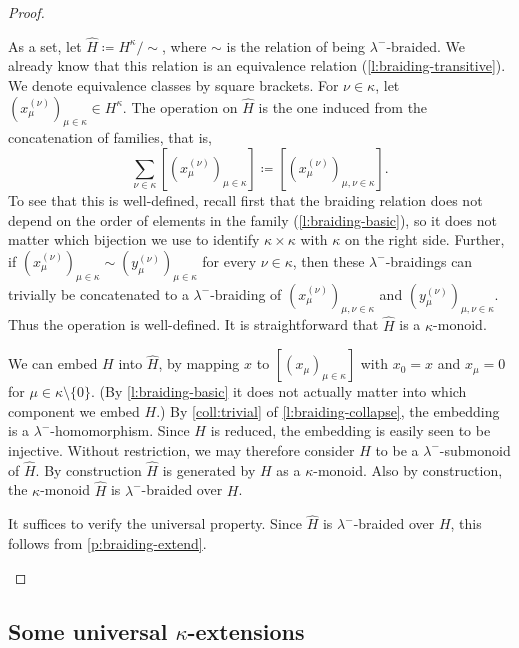 \documentclass[a4paper,11pt,oneside]{amsart}
\theoremstyle{remark}
\begin{document}
\begin{proof}
  \begin{proofenumerate}
  \item[\ref{ue:braided}]
  As a set, let $\widehat H \coloneqq H^\kappa /\! \sim$, where $\sim$ is the relation of being $\lambda^-$-braided.
  We already know that this relation is an equivalence relation (\cref{l:braiding-transitive}).
  We denote equivalence classes by square brackets.
  For $\nu \in \kappa$, let $(x_{\mu}^{(\nu)})_{\mu \in \kappa} \in H^\kappa$.
  The operation on $\widehat H$ is the one induced from the concatenation of families, that is,
  \[
    \sum_{\nu \in \kappa} [ (x_\mu^{(\nu)})_{\mu \in \kappa} ] \coloneqq [(x_{\mu}^{(\nu)})_{\mu, \nu \in \kappa}].
  \]
  To see that this is well-defined, recall first that the braiding relation does not depend on the order of elements in the family (\cref{l:braiding-basic}), so it does not matter which bijection we use to identify $\kappa \times \kappa$ with $\kappa$ on the right side.
  Further, if $(x_\mu^{(\nu)})_{\mu \in \kappa} \sim (y_\mu^{(\nu)})_{\mu \in \kappa}$ for every $\nu \in \kappa$, then these $\lambda^-$-braidings can trivially be concatenated to a $\lambda^-$-braiding of $(x_\mu^{(\nu)})_{\mu,\nu \in \kappa}$ and $(y_\mu^{(\nu)})_{\mu,\nu \in \kappa}$.
  Thus the operation is well-defined.
  It is straightforward that $\widehat H$ is a $\kappa$-monoid.

  We can embed $H$ into $\widehat H$, by mapping $x$ to $[(x_\mu)_{\mu \in \kappa}]$ with $x_0=x$ and $x_\mu = 0$ for $\mu \in \kappa \setminus \{0\}$.
  (By \cref{l:braiding-basic} it does not actually matter into which component we embed $H$.)
  By \ref{coll:trivial} of \cref{l:braiding-collapse}, the embedding is a $\lambda^-$-homomorphism.
  Since $H$ is reduced, the embedding is easily seen to be injective.
  Without restriction, we may therefore consider $H$ to be a $\lambda^-$-submonoid of $\widehat H$.
  By construction $\widehat H$ is generated by $H$ as a $\kappa$-monoid.
  Also by construction, the $\kappa$-monoid $\widehat H$ is $\lambda^-$-braided over $H$.
  
  \item[\ref{ue:universal}] It suffices to verify the universal property.
  Since $\widehat H$ is $\lambda^-$-braided over $H$, this follows from \cref{p:braiding-extend}. \qedhere
  \end{proofenumerate}
\end{proof}


\subsection{Some universal \texorpdfstring{$\kappa$}{κ}-extensions}
\end{document}
